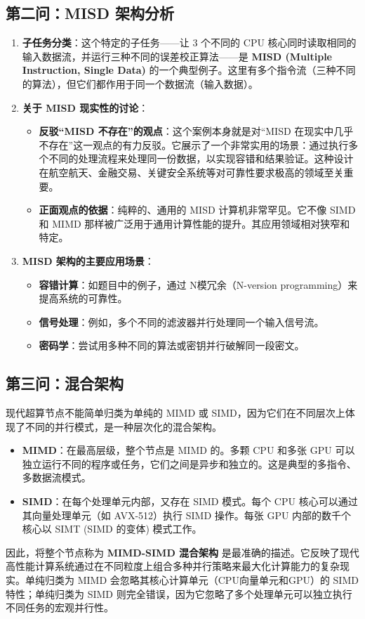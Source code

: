 \subsection{第二问：MISD 架构分析}
\begin{enumerate}
    \item \textbf{子任务分类}：这个特定的子任务——让 3 个不同的 CPU 核心同时读取相同的输入数据流，并运行三种不同的误差校正算法——是 \textbf{MISD (Multiple Instruction, Single Data)} 的一个典型例子。这里有多个指令流（三种不同的算法），但它们都作用于同一个数据流（输入数据）。
    \item \textbf{关于 MISD 现实性的讨论}：
    \begin{itemize}
        \item \textbf{反驳“MISD 不存在”的观点}：这个案例本身就是对“MISD 在现实中几乎不存在”这一观点的有力反驳。它展示了一个非常实用的场景：通过执行多个不同的处理流程来处理同一份数据，以实现容错和结果验证。这种设计在航空航天、金融交易、关键安全系统等对可靠性要求极高的领域至关重要。
        \item \textbf{正面观点的依据}：纯粹的、通用的 MISD 计算机非常罕见。它不像 SIMD 和 MIMD 那样被广泛用于通用计算性能的提升。其应用领域相对狭窄和特定。
    \end{itemize}
    \item \textbf{MISD 架构的主要应用场景}：
    \begin{itemize}
        \item \textbf{容错计算}：如题目中的例子，通过 N模冗余（N-version programming）来提高系统的可靠性。
        \item \textbf{信号处理}：例如，多个不同的滤波器并行处理同一个输入信号流。
        \item \textbf{密码学}：尝试用多种不同的算法或密钥并行破解同一段密文。
    \end{itemize}
\end{enumerate}

\subsection{第三问：混合架构}
现代超算节点不能简单归类为单纯的 MIMD 或 SIMD，因为它们在不同层次上体现了不同的并行模式，是一种层次化的混合架构。
\begin{itemize}
    \item \textbf{MIMD}：在最高层级，整个节点是 MIMD 的。多颗 CPU 和多张 GPU 可以独立运行不同的程序或任务，它们之间是异步和独立的。这是典型的多指令、多数据流模式。
    \item \textbf{SIMD}：在每个处理单元内部，又存在 SIMD 模式。每个 CPU 核心可以通过其向量处理单元（如 AVX-512）执行 SIMD 操作。每张 GPU 内部的数千个核心以 SIMT (SIMD 的变体) 模式工作。
\end{itemize}
因此，将整个节点称为 \textbf{MIMD-SIMD 混合架构} 是最准确的描述。它反映了现代高性能计算系统通过在不同粒度上组合多种并行策略来最大化计算能力的复杂现实。单纯归类为 MIMD 会忽略其核心计算单元（CPU向量单元和GPU）的 SIMD 特性；单纯归类为 SIMD 则完全错误，因为它忽略了多个处理单元可以独立执行不同任务的宏观并行性。


